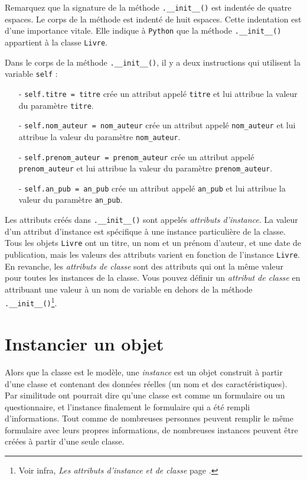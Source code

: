 \documentclass[a4paper,11pt]{book}
\begin{document}
Remarquez que la signature de la méthode \texttt{.\_\_init\_\_()} est indentée de quatre espaces. Le corps de la méthode est indenté de huit espaces. Cette indentation est d'une importance vitale. Elle indique à \texttt{Python} que la méthode \texttt{.\_\_init\_\_()} appartient à la classe \texttt{Livre}.
\medskip

Dans le corps de la méthode \texttt{.\_\_init\_\_()}, il y a deux instructions qui utilisent la variable \texttt{self} :
\begin{itemize}
	\item[- \texttt{self.titre = titre}] crée un attribut appelé \texttt{titre} et lui attribue la valeur du paramètre \texttt{titre}.
    \item[- \texttt{self.nom\_auteur = nom\_auteur}] crée un attribut appelé \texttt{nom\_auteur} et lui attribue la valeur du paramètre \texttt{nom\_auteur}.
    \item[- \texttt{self.prenom\_auteur = prenom\_auteur}] crée un attribut appelé \texttt{prenom\_auteur} et lui attribue la valeur du paramètre \texttt{prenom\_auteur}.
    \item[- \texttt{self.an\_pub = an\_pub}] crée un attribut appelé \texttt{an\_pub} et lui attribue la valeur du paramètre \texttt{an\_pub}.
\end{itemize}
\medskip

Les attributs créés dans \texttt{.\_\_init\_\_()} sont appelés \textit{attributs d'instance}. La valeur d'un attribut d'instance est spécifique à une instance particulière de la classe. Tous les objets \texttt{Livre} ont un titre, un nom et un prénom d'auteur, et une date de publication, mais les valeurs des attributs varient en fonction de l'instance \texttt{Livre}. En revanche, les \textit{attributs de classe} sont des attributs qui ont la même valeur pour toutes les instances de la classe. Vous pouvez définir un \textit{attribut de classe} en attribuant une valeur à un nom de variable en dehors de la méthode \texttt{.\_\_init\_\_()}\footnote{Voir infra, \textit{Les attributs d'instance et de classe} page \pageref{AttributDeClasse}.}.
\medskip

\section{Instancier un objet}
Alors que la classe est le modèle, une \textit{instance} est un objet construit à partir d'une classe et contenant des données réelles (un nom et des caractéristiques). Par similitude ont pourrait dire qu'une classe est comme un formulaire ou un questionnaire, et l'instance finalement le formulaire qui a été rempli d'informations. Tout comme de nombreuses personnes peuvent remplir le même formulaire avec leurs propres informations, de nombreuses instances peuvent être créées à partir d'une seule classe.
\medskip
\end{document}
